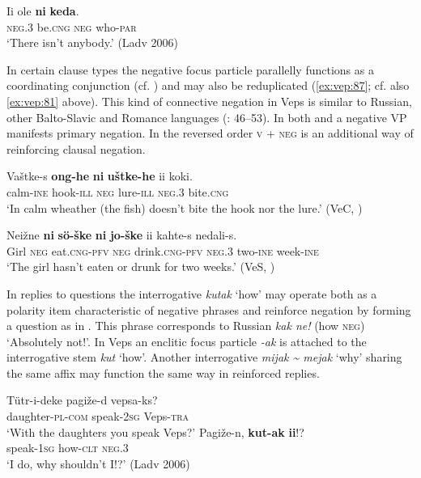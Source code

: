 \documentclass[output=paper,colorlinks=true, citecolor=brown]{langscibook}
\begin{document}
\ea\label{ex:vep:85} 
    \gll Ii  ole \textbf{ni} \textbf{keda}.\\ 
         \textsc{neg.3} {be.}{\textsc{cng}}{} {\textsc{neg}} {who-}{\textsc{par}}\\
    \glt ‘There isn’t anybody.’ (Ladv 2006)
\z 

In certain clause types the negative focus particle parallelly functions as a coordinating conjunction  (cf. ) and may also be reduplicated (\ref{ex:vep:87}; cf. also \ref{ex:vep:81} above). This kind of connective negation in Veps is similar to Russian, other Balto-Slavic and Romance languages (\citealt{AuweraEtAl2021}: 46–53). In both  and  a negative VP manifests primary negation. In  the reversed order \textsc{v} + \textsc{neg} is an additional way of reinforcing clausal negation.

\ea\label{ex:vep:86} 
    \gll  Vaštke-s \textbf{ong-he} \textbf{ni} \textbf{uštke-he} ii koki.\\ 
          calm-\textsc{ine} hook{}-\textsc{ill} \textsc{neg} lure{}-\textsc{ill} \textsc{neg.3} bite.\textsc{cng}\\
    \glt ‘In calm wheather (the fish) doesn’t bite the hook nor the lure.’ (VeC, \citealt[435]{MSFOu86})
\z 

\ea\label{ex:vep:87} 
    \gll Neižne \textbf{ni} \textbf{sö-ške} \textbf{ni} \textbf{jo-ške} ii kahte-s nedali-s. \\ 
         Girl \textsc{neg} eat.\textsc{cng}-\textsc{pfv}{} \textsc{neg} drink.\textsc{cng}-\textsc{pfv} \textsc{neg.3} two{}-\textsc{ine} week{}-\textsc{ine} \\
    \glt ‘The girl hasn’t eaten or drunk for two weeks.’ (VeS, \citealt[277]{MSFOu86})
\z 

In replies to questions the interrogative \textit{kutak} ‘how’ may operate both as a polarity item characteristic of negative phrases and reinforce negation by forming a question as in . This phrase corresponds to Russian \textit{kak ne!} (how \textsc{neg}) ‘Absolutely not!’. In Veps an enclitic focus particle \textit{{}-ak} is attached to the interrogative stem \textit{kut} ‘how’. Another interrogative \textit{mijak {\textasciitilde} mejak} ‘why’ sharing the same affix may function the same way in reinforced replies.

\ea\label{ex:vep:88}
    \ea\label{ex:vep:88a}
        \gll  Tütr{}-i{}-deke  pagiže{}-d vepsa{}-ks?\\ 
               daughter{}-\textsc{pl{}-com} speak{}-\textsc{2sg} Veps{}-\textsc{tra}\\
        \glt ‘With the daughters you speak Veps?’
    \ex\label{ex:vep:88b}
        \gll  Pagiže{}-n, \textbf{kut-ak} \textbf{ii}!?\\
              speak{}-\textsc{1sg} how-\textsc{clt} \textsc{neg.3}\\
        \glt ‘I do, why shouldn’t I!?’ (Ladv 2006)
    \z
\z 
\end{document}
